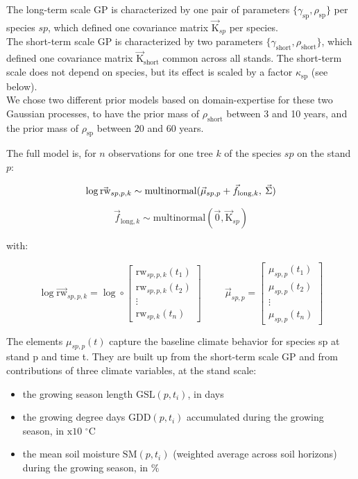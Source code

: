 \noindent The long-term scale GP is characterized by one pair of parameters $\{\gamma_{\text{sp}}, \rho_{\text{sp}}\}$ per species $sp$, which defined one covariance matrix $\vec{\mathrm{K}}_{sp}$ per species. \\
The short-term scale GP is characterized by two parameters $\{\gamma_{\text{short}}, \rho_{\text{short}}\}$, which defined one covariance matrix $\vec{\mathrm{K}}_\text{short}$ common across all stands. The short-term scale does not depend on species, but its effect is scaled by a factor $\kappa_\text{sp}$ (see below). \\
We chose two different prior models based on domain-expertise for these two Gaussian processes, to have the prior mass of $\rho_{\text{short}}$ between 3 and 10 years, and the prior mass of $\rho_{\text{sp}}$ between 20 and 60 years.

\vspace{0.5cm}

\noindent The full model is, for $n$ observations for one tree $k$ of the species $sp$ on the stand $p$:

$$\log\vec{\text{rw}}_{sp,p,k} \sim \text{multinormal}(\vec{\mu}_{sp,p} + \vec{f}_{\text{long},k}, \hspace{0.08cm} \vec{\Sigma})$$

$$\vec{f}_{\text{long},k} \sim \text{multinormal}(\vec{0}, \vec{\mathrm{K}}_{sp})$$

\noindent with:

$$
\log\vec{\text{rw}}_{sp,p,k} = 
\log \circ \begin{bmatrix}
  \text{rw}_{sp,p,k}(t_1) \\
  \text{rw}_{sp,p,k}(t_2) \\
  \vdots \\
  \text{rw}_{sp,k}(t_n)
\end{bmatrix}
\hspace{1cm}
\vec{\mu}_{sp,p} = 
\begin{bmatrix}
  \mu_{sp,p}(t_1) \\
  \mu_{sp,p}(t_2) \\
  \vdots \\
  \mu_{sp,p}(t_n)
\end{bmatrix}
$$

\vspace{0.25cm}

\noindent The elements $\mu_{sp,p}(t)$ capture the baseline climate behavior for species sp at stand p and time t. They are built up from the short-term scale GP and from contributions of three climate variables, at the stand scale:
\begin{itemize}
    \item the growing season length $\text{GSL}(p,t_i)$, in days
    \item the growing degree days $\text{GDD}(p,t_i)$ accumulated during the growing season, in $\text{x}10$ $^{\circ}$C
    \item the mean soil moisture $\text{SM}(p,t_i)$ (weighted average across soil horizons) during the growing season, in $\%$
\end{itemize}

